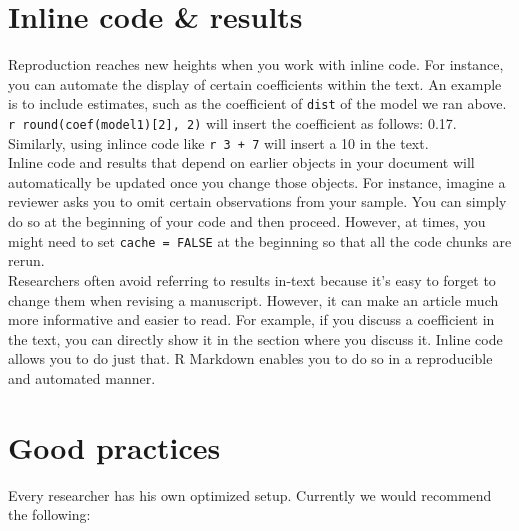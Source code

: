 \documentclass[
  12pt,
]{article}
\begin{document}
\hypertarget{inline-code-results}{%
\section{Inline code \& results}\label{inline-code-results}}

Reproduction reaches new heights when you work with inline code. For instance, you can automate the display of certain coefficients within the text. An example is to include estimates, such as the coefficient of \texttt{dist} of the model we ran above. \texttt{\textasciigrave{}r\ round(coef(model1){[}2{]},\ 2)\textasciigrave{}} will insert the coefficient as follows: 0.17. Similarly, using inlince code like \texttt{\textasciigrave{}r\ 3\ +\ 7\textasciigrave{}} will insert a 10 in the text.\\
Inline code and results that depend on earlier objects in your document will automatically be updated once you change those objects. For instance, imagine a reviewer asks you to omit certain observations from your sample. You can simply do so at the beginning of your code and then proceed. However, at times, you might need to set \texttt{cache\ =\ FALSE} at the beginning so that all the code chunks are rerun.\\
Researchers often avoid referring to results in-text because it's easy to forget to change them when revising a manuscript. However, it can make an article much more informative and easier to read. For example, if you discuss a coefficient in the text, you can directly show it in the section where you discuss it. Inline code allows you to do just that. R Markdown enables you to do so in a reproducible and automated manner.

\hypertarget{good-practices}{%
\section{Good practices}\label{good-practices}}

Every researcher has his own optimized setup. Currently we would recommend the following:
\end{document}
